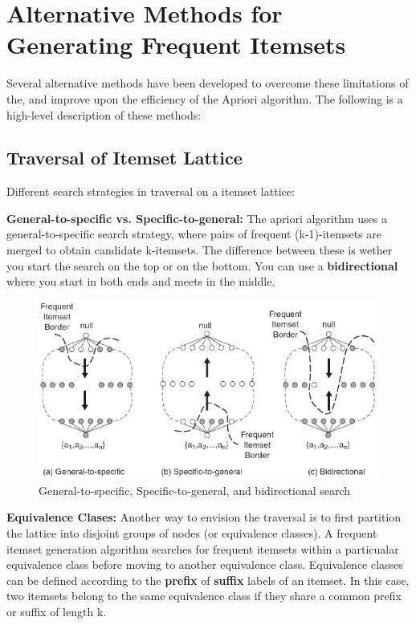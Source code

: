  	\section{Alternative Methods for Generating Frequent Itemsets}

 		Several alternative methods have been developed to overcome these limitations of the,
 		and improve upon the efficiency of the Apriori algorithm. The following is a high-level
 		description of these methods:

 		\subsection{Traversal of Itemset Lattice}

 		Different search strategies in  traversal on a itemset lattice:
 		
 		{\bf General-to-specific vs. Specific-to-general:} The apriori 
 			algorithm uses a general-to-specific search strategy, where pairs of
 			frequent (k-1)-itemsets are merged to obtain candidate k-itemsets.
 			The difference between these is wether you start the search on the top
 			or on the bottom. You can use a {\bf bidirectional} where you start in both
 			ends and meets in the middle. 

 			\begin{figure}[H]
 				\centering
 				\includegraphics[scale=0.5]{pics/traversal.png}
 				\caption{General-to-specific, Specific-to-general, and bidirectional search}
 			\end{figure}
 		
 		{\bf Equivalence Clases:} Another way to envision the traversal is to
 			first partition the lattice into disjoint groups of nodes (or equivalence classes).
 			A frequent itemset generation algorithm searches for frequent itemsets within
 			a particualar equivalence class before moving to another equivalence class. 
 			Equivalence classes can be defined according to the {\bf prefix} of {\bf suffix} labels of 
 			an itemset. In this case, two itemsets belong to the same equivalence class if 
 			they share a common prefix or suffix of length k.

